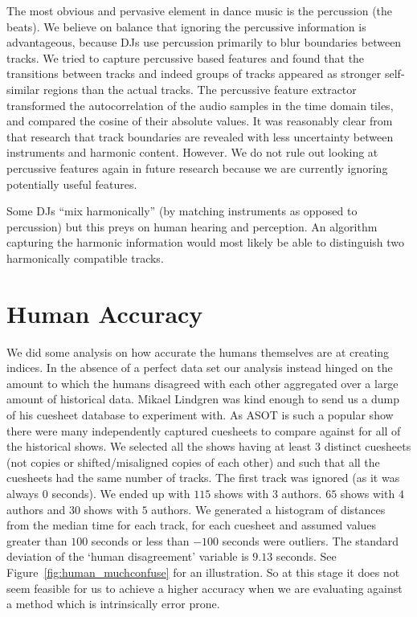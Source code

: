 \documentclass[twocolumn]{article}
\begin{document}
	The most obvious and pervasive element in dance music is the percussion (the beats). We believe on balance that ignoring the percussive information is advantageous, because DJs use percussion primarily to blur boundaries between tracks.  We tried to capture percussive based features and found that the transitions between tracks and indeed groups of tracks appeared as stronger self-similar regions than the actual tracks. The percussive feature extractor transformed the autocorrelation of the audio samples in the time domain tiles, and compared the cosine of their absolute values. It was reasonably clear from that  research that track boundaries are revealed with less uncertainty between instruments and harmonic content. However. We do not rule out looking at percussive features again in future research because we are currently ignoring potentially useful features.
	
	Some DJs ``mix harmonically'' (by matching instruments as opposed to percussion) but this preys on human hearing and perception. An algorithm capturing the harmonic information would most likely be able to distinguish two harmonically compatible tracks. 
	
	\section{Human Accuracy}\label{human_acc}
	
	We did some analysis on how accurate the humans themselves are at creating indices. In the absence of a perfect data set our analysis instead hinged on the amount to which the humans disagreed with each other aggregated over a large amount of historical data. Mikael Lindgren was kind enough to send us a dump of his cuesheet database to experiment with. As ASOT is such a popular show there were many independently captured cuesheets to compare against for all of the historical shows. We selected all the shows having at least $3$ distinct cuesheets (not copies or shifted/misaligned copies of each other)  and such that all the cuesheets had the same number of tracks. The first track was ignored (as it was always $0$ seconds). We ended up with $115$ shows with $3$ authors. $65$ shows with $4$ authors and $30$ shows with $5$ authors.  We generated a histogram of distances from the median time for each track, for each cuesheet and assumed values greater than $100$ seconds or less than $-100$ seconds were outliers. The standard deviation of the `human disagreement' variable is $9.13$ seconds. See Figure~\ref{fig:human_muchconfuse} for an illustration. So at this stage it does not seem feasible for us to achieve a higher accuracy when we are evaluating against a method which is intrinsically error prone.
	
\end{document}
